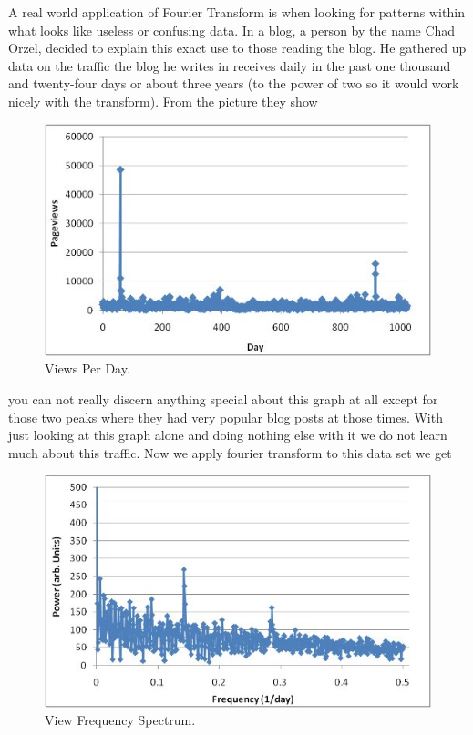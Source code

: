 \documentclass [../article.tex]{subfiles}
\begin{document}
  A real world application of Fourier Transform is when
  looking for patterns within what looks like useless or
  confusing data. In a blog, a person by the name Chad
  Orzel, decided to explain this exact use to those
  reading the blog. He gathered up data on the traffic the
  blog he writes in receives daily in the past one thousand
  and twenty-four days or about three years (to the power of
  two so it would work nicely with the transform).
  From the picture they show
  \begin{figure}[h!]
    \includegraphics[width=\linewidth]{../img/evar/1.jpg}
    \caption{Views Per Day.}
    \label{fig:views}
  \end{figure}
  you can not really discern anything special about this graph
  at all except for those two peaks where they had very popular
  blog posts at those times. With just looking at this graph
  alone and doing nothing else with it we do not learn much
  about this traffic. Now we apply fourier transform to this
  data set we get
  \begin{figure}[h!]
    \includegraphics[width=\linewidth]{../img/evar/2.jpg}
    \caption{View Frequency Spectrum.}
    \label{fig:viewfreq}
  \end{figure}
\end{document}
